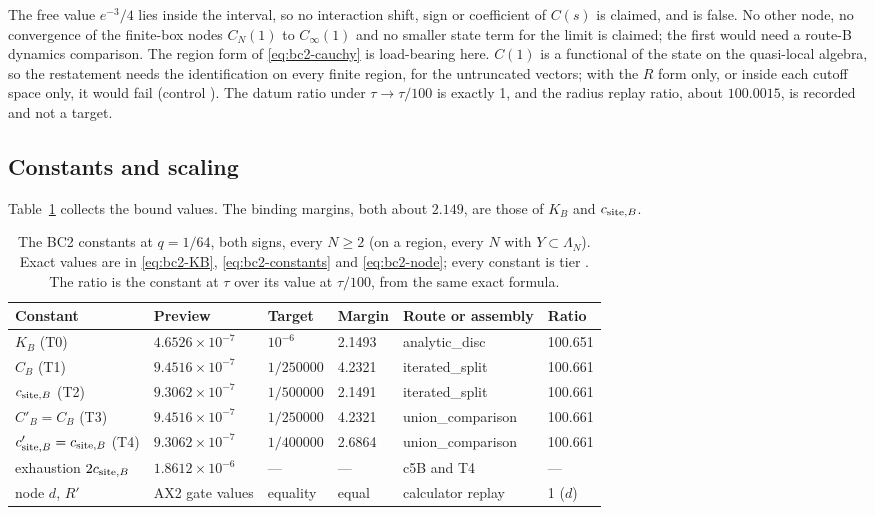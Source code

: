 The free value $e^{-3}/4$ lies inside the interval, so no interaction shift,
sign or coefficient of $C(s)$ is claimed, and
 is false. No other node, no convergence of
the finite-box nodes $C_N(1)$ to $C_\infty(1)$ and no smaller state term for
the limit is claimed; the first would need a route-B dynamics comparison. The
region form of \eqref{eq:bc2-cauchy} is load-bearing here. $C(1)$ is a
functional of the state on the quasi-local algebra, so the restatement needs
the identification on every finite region, for the untruncated vectors; with
the $R$ form only, or inside each cutoff space only, it would fail (control
). The datum ratio under
$\tau\to\tau/100$ is exactly 1, and the radius replay ratio, about
$100.0015$, is recorded and not a target.

\subsection{Constants and scaling}
\label{sec:bc2-table}
Table~\ref{tab:bc2-constants} collects the bound values. The binding margins,
both about $2.149$, are those of $K_B$ and $c_{{\rm site},B}$.

\begin{table}[htbp]
\centering\small
\caption{The BC2 constants at $q=1/64$, both signs, every $N\ge2$ (on a
region, every $N$ with $Y\subset\Lambda_N$). Exact values are in
\eqref{eq:bc2-KB}, \eqref{eq:bc2-constants} and \eqref{eq:bc2-node}; every
constant is tier . The ratio is the constant at
$\tau$ over its value at $\tau/100$, from the same exact formula.}
\label{tab:bc2-constants}
\begin{tabular}{@{}lllll l@{}}
\toprule
Constant & Preview & Target & Margin & Route or assembly & Ratio\\
\midrule
$K_B$ (T0) & $4.6526\times10^{-7}$ & $10^{-6}$ & 2.1493 & analytic\_disc & 100.651\\
$C_B$ (T1) & $9.4516\times10^{-7}$ & $1/250000$ & 4.2321 & iterated\_split & 100.661\\
$c_{{\rm site},B}$ (T2) & $9.3062\times10^{-7}$ & $1/500000$ & 2.1491 & iterated\_split & 100.661\\
$C'_B=C_B$ (T3) & $9.4516\times10^{-7}$ & $1/250000$ & 4.2321 & union\_comparison & 100.661\\
$c'_{{\rm site},B}=c_{{\rm site},B}$ (T4) & $9.3062\times10^{-7}$ & $1/400000$ & 2.6864 & union\_comparison & 100.661\\
exhaustion $2c_{{\rm site},B}$ & $1.8612\times10^{-6}$ & --- & --- & c5B and T4 & ---\\
node $d$, $R'$ & AX2 gate values & equality & equal & calculator replay & 1 ($d$)\\
\bottomrule
\end{tabular}
\end{table}


